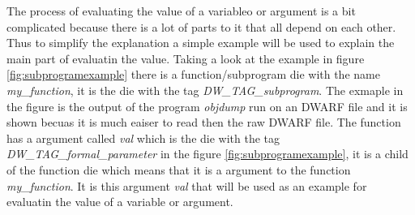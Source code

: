  


The process of evaluating the value of a variableo or argument is a bit complicated because there is a lot of parts to it that all depend on each other.
Thus to simplify the explanation a simple example will be used to explain the main part of evaluatin the value.
Taking a look at the example in figure \ref{fig:subprogramexample} there is a function/subprogram \gls{die} with the name \emph{my\_function}, it is the \gls{die} with the tag \emph{DW\_TAG\_subprogram}.
The exmaple in the figure is the output of the program \emph{objdump} run on an \gls{DWARF} file and it is shown becuas it is much eaiser to read then the raw \gls{DWARF} file.
The function has a argument called \emph{val} which is the \gls{die} with the tag \emph{DW\_TAG\_formal\_parameter} in the figure \ref{fig:subprogramexample}, it is a child of the function \gls{die} which means that it is a argument to the function \emph{my\_function}.
It is this argument \emph{val} that will be used as an example for evaluatin the value of a variable or argument.

